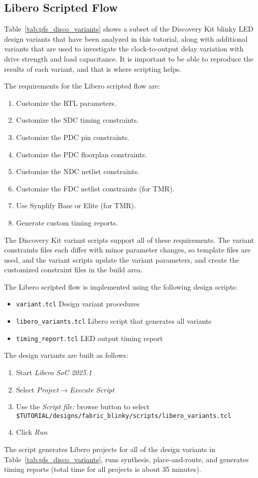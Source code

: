 \clearpage
\subsection{Libero Scripted Flow}

Table~\ref{tab:pfs_disco_variants} shows a subset of the Discovery Kit blinky
LED design variants that have been analyzed in this tutorial, along with
additional variants that are used to investigate the clock-to-output
delay variation with drive strength and load capacitance.
%
It is important to be able to reproduce the results of each variant,
and that is where scripting helps.

The requirements for the Libero scripted flow are:
%
\begin{enumerate}
\item Customize the RTL parameters.
\item Customize the SDC timing constraints.
\item Customize the PDC pin constraints.
\item Customize the PDC floorplan constraints.
\item Customize the NDC netlist constraints.
\item Customize the FDC netlist constraints (for TMR).
\item Use Synplify Base or Elite (for TMR).
\item Generate custom timing reports.
\end{enumerate}
%
The Discovery Kit variant scripts support all of these requirements.
The variant constraints files each differ with minor  parameter changes,
so template files are used, and the variant scripts update the variant
parameters, and create the customized constraint files in the build area.

The Libero scripted flow is implemented using the following design scripts:
%
\begin{itemize}
\item \verb+variant.tcl+ Design variant procedures
\item \verb+libero_variants.tcl+ Libero script that generates all variants
\item \verb+timing_report.tcl+ LED output timing report
\end{itemize}
%
The design variants are built as follows:
%
\begin{enumerate}
\item Start \emph{Libero SoC 2025.1}
\item Select \emph{Project$\rightarrow$Execute Script}
\item Use the \emph{Script file:} browse button to select\newline
\verb+$TUTORIAL/designs/fabric_blinky/scripts/libero_variants.tcl+%
\item Click \emph{Run}
\end{enumerate}
%
The script generates Libero projects for all of the design variants in
Table~\ref{tab:pfs_disco_variants}, runs synthesis, place-and-route,
and generates timing reports (total time for all projects is about 35 minutes).

